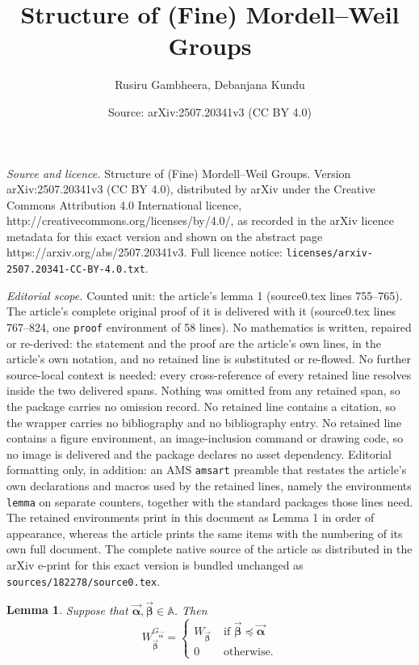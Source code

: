 \documentclass[10pt,a4paper]{amsart}
\title{Structure of (Fine) Mordell--Weil Groups}
\author{Rusiru Gambheera, Debanjana Kundu}
\date{Source: arXiv:2507.20341v3 (CC BY 4.0)}
\newtheorem{lemma}{Lemma}
\newcommand{\A}{\mathbb{A}}
\newcommand{\val}{\vec{\boldsymbol{\alpha}}}
\newcommand{\veb}{\vec{\boldsymbol{\beta}}}
\begin{document}
\maketitle

\noindent\emph{Source and licence.} Structure of (Fine) Mordell--Weil Groups. Version arXiv:2507.20341v3 (CC BY 4.0), distributed by arXiv under the Creative Commons Attribution 4.0 International licence, http://creativecommons.org/licenses/by/4.0/, as recorded in the arXiv licence metadata for this exact version and shown on the abstract page https://arxiv.org/abs/2507.20341v3. Full licence notice: \texttt{licenses/arxiv-2507.20341-CC-BY-4.0.txt}.\par\smallskip

\noindent\textit{Editorial scope.} Counted unit: the article's lemma 1 (source0.tex lines 755--765). The article's complete original proof of it is delivered with it (source0.tex lines 767--824, one \texttt{proof} environment of 58 lines). No mathematics is written, repaired or re-derived: the statement and the proof are the article's own lines, in the article's own notation, and no retained line is substituted or re-flowed.  No further source-local context is needed: every cross-reference of every retained line resolves inside the two delivered spans.  Nothing was omitted from any retained span, so the package carries no omission record.  No retained line contains a citation, so the wrapper carries no bibliography and no bibliography entry.  No retained line contains a figure environment, an image-inclusion command or drawing code, so no image is delivered and the package declares no asset dependency.  Editorial formatting only, in addition: an AMS \texttt{amsart} preamble that restates the article's own declarations and macros used by the retained lines, namely the environments \texttt{lemma} on separate counters, together with the standard packages those lines need.  The retained environments print in this document as Lemma 1 in order of appearance, whereas the article prints the same items with the numbering of its own full document.  The complete native source of the article as distributed in the arXiv e-print for this exact version is bundled unchanged as \texttt{sources/182278/source0.tex}.
\begin{lemma}
\label{lemma 1 for Prop 2 of note 1}
Suppose that $\val, \veb\in \A$.
Then
\[
W_{\veb}^{G_{\val}} = \begin{cases}
W_{\veb} & \text{ if } \veb \preccurlyeq \val\\
0 & \text{ otherwise}.
\end{cases}
\]
\end{lemma}
\end{document}
